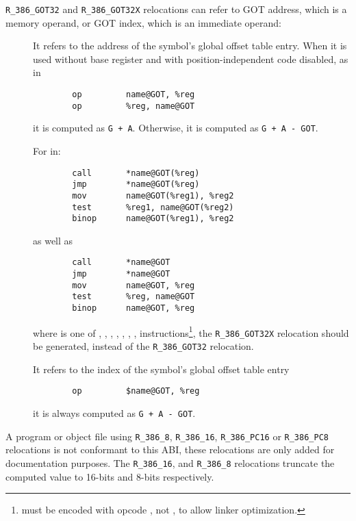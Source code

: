 \texttt{R_386_GOT32} and \texttt{R_386_GOT32X} relocations can refer
to GOT address, which is a memory operand, or GOT index, which is an
immediate operand:

\begin{description}
\item[] It refers to the address of the symbol's global
offset table entry.  When it is used without base register and with
position-independent code disabled, as in

\begin{verbatim}
        op         name@GOT, %reg
        op         %reg, name@GOT
\end{verbatim}

\noindent
it is computed as \texttt{G + A}.  Otherwise, it is computed as
\texttt{G + A - GOT}.

For  in:
\begin{verbatim}
        call       *name@GOT(%reg)
        jmp        *name@GOT(%reg)
        mov        name@GOT(%reg1), %reg2
        test       %reg1, name@GOT(%reg2)
        binop      name@GOT(%reg1), %reg2
\end{verbatim}

\noindent
as well as

\begin{verbatim}
        call       *name@GOT
        jmp        *name@GOT
        mov        name@GOT, %reg
        test       %reg, name@GOT
        binop      name@GOT, %reg
\end{verbatim}

\noindent
where  is one of , , ,
, , , , 
instructions\footnote{ must be encoded with
opcode , not , to allow linker optimization.},
the \texttt{R_386_GOT32X} relocation should be generated, instead of
the \texttt{R_386_GOT32} relocation.

\item[] It refers to the index of the symbol's global
offset table entry

\begin{verbatim}
        op         $name@GOT, %reg
\end{verbatim}
it is always computed as \texttt{G + A - GOT}.
\end{description}

\begin{sloppypar}
A program or object file using \texttt{R_386_8},
\texttt{R_386_16}, \texttt{R_386_PC16} or \texttt{R_386_PC8}
relocations is not conformant to this ABI, these relocations are only
added for documentation purposes.  The \texttt{R_386_16}, and
\texttt{R_386_8} relocations truncate the computed value to 16-bits
and 8-bits respectively.
\end{sloppypar}


